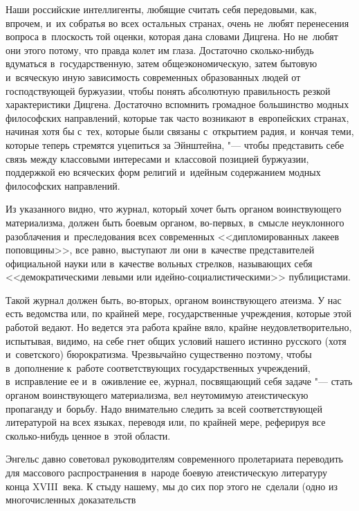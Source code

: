 Наши российские интеллигенты, любящие считать себя передовыми, как, впрочем, и~их собратья во всех остальных странах, очень не~любят перенесения вопроса в~плоскость той оценки, которая дана словами Дицгена. Но не~любят они этого потому, что правда колет им глаза. Достаточно сколько-нибудь вдуматься в~государственную, затем общеэкономическую, затем бытовую и~всяческую иную зависимость современных образованных людей от господствующей буржуазии, чтобы понять абсолютную правильность резкой характеристики Дицгена. Достаточно вспомнить громадное большинство модных философских направлений, которые так часто возникают в~европейских странах, начиная хотя бы с~тех, которые были связаны с~открытием радия, и~кончая теми, которые теперь стремятся уцепиться за Эйнштейна, "--- чтобы представить себе связь между классовыми интересами и~классовой позицией буржуазии, поддержкой ею всяческих форм религий и~идейным содержанием модных философских направлений.

Из указанного видно, что журнал, который хочет быть органом воинствующего материализма, должен быть боевым органом, во-первых, в~смысле неуклонного разоблачения и~преследования всех современных <<дипломированных лакеев поповщины>>, все равно, выступают ли они в~качестве представителей официальной науки или в~качестве вольных стрелков, называющих себя <<демократическими левыми или идейно-социалистическими>> публицистами.

Такой журнал должен быть, во-вторых, органом воинствующего атеизма. У нас есть ведомства или, по крайней мере, государственные учреждения, которые этой работой ведают. Но ведется эта работа крайне вяло, крайне неудовлетворительно, испытывая, видимо, на себе гнет общих условий нашего истинно русского (хотя и~советского) бюрократизма. Чрезвычайно существенно поэтому, чтобы в~дополнение к~работе соответствующих государственных учреждений, в~исправление ее и~в~оживление ее, журнал, посвящающий себя задаче "--- стать органом воинствующего материализма, вел неутомимую атеистическую пропаганду и~борьбу. Надо внимательно следить за всей соответствующей литературой на всех языках, переводя или, по крайней мере, реферируя все сколько-нибудь ценное в~этой области.

Энгельс давно советовал руководителям современного пролетариата переводить для массового распространения в~народе боевую атеистическую литературу конца XVIII~века. К стыду нашему, мы до сих пор этого не~сделали (одно из многочисленных доказательств

